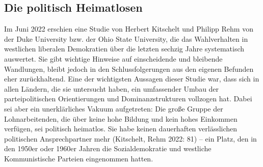   
\begin{multicols*}{2}
    \section{Die politisch Heimatlosen}

    \noindent Im Juni 2022 erschien eine Studie von Herbert Kitschelt und Philipp Rehm von der Duke University bzw. der Ohio State University, die das Wahlverhalten in westlichen liberalen Demokratien über die letzten sechzig Jahre systematisch auswertet. Sie gibt wichtige Hinweise auf einscheidende und bleibende Wandlungen, bleibt jedoch in den Schlussfolgerungen aus den eigenen Befunden eher zurückhaltend. Eine der wichtigsten Aussagen dieser Studie war, dass sich in allen Ländern, die sie untersucht haben, ein umfassender Umbau der parteipolitischen Orientierungen und Dominanzstrukturen vollzogen hat. Dabei sei aber ein unerklärliches Vakuum aufgetreten: Die große Gruppe der Lohnarbeitenden, die über keine hohe Bildung und kein hohes Einkommen verfügen, sei politisch heimatlos. Sie habe keinen dauerhaften verlässlichen politischen Ansprechpartner mehr (Kitschelt, Rehm 2022: 81) – ein Platz, den in den 1950er oder 1960er Jahren die Sozialdemokratie und westliche Kommunistische Parteien eingenommen hatten.


\end{multicols*}
